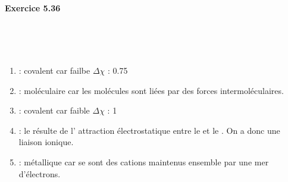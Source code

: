\documentclass{article}
\newcommand\exercice[1]{%
\paragraph{#1}%
~\par
~\par}
\begin{document}
\exercice{Exercice 5.36}

\begin{enumerate}\renewcommand{\theenumi}{\alph{enumi}}
	\item	{} : covalent car failbe $\Delta \chi$ : 0.75
	\item	{} : moléculaire car les molécules sont liées par des forces intermoléculaires.
	\item	{} : covalent car faible $\Delta \chi$ : 1
	\item	{} : le  résulte de l'
				attraction électrostatique entre le 
				et le . On a donc une liaison ionique.
	\item	{} : métallique car se sont des cations maintenus ensemble par une mer d'électrons.
\end{enumerate}	
				
\end{document}
